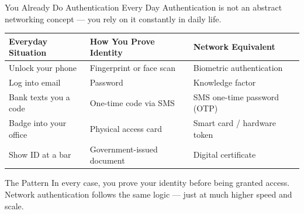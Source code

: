 \documentclass[aspectratio=169]{beamer}  %
\begin{document}
\begin{frame}{You Already Do Authentication Every Day}
    \footnotesize
    Authentication is not an abstract networking concept --- you rely on it constantly in daily life.

    \vspace{0.4em}
    \begin{table}[]
        \renewcommand{\arraystretch}{1.3}
        \centering
        \begin{tabular}{|l|l|l|}
        \hline
        \rowcolor[HTML]{EFEFEF} \textbf{Everyday Situation} & \textbf{How You Prove Identity} & \textbf{Network Equivalent} \\ \hline
        Unlock your phone & Fingerprint or face scan & Biometric authentication \\ \hline
        Log into email & Password & Knowledge factor \\ \hline
        Bank texts you a code & One-time code via SMS & SMS one-time password (OTP) \\ \hline
        Badge into your office & Physical access card & Smart card / hardware token \\ \hline
        Show ID at a bar & Government-issued document & Digital certificate \\ \hline
        \end{tabular}
    \end{table}

    \begin{exampleblock}{The Pattern}
        \footnotesize
        In every case, you prove your identity before being granted access. Network authentication follows the same logic --- just at much higher speed and scale.
    \end{exampleblock}
\end{frame}
\end{document}
